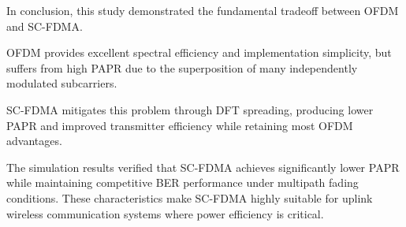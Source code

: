 In conclusion, this study demonstrated the fundamental tradeoff between
OFDM and SC-FDMA.

OFDM provides excellent spectral efficiency and implementation simplicity,
but suffers from high PAPR due to the superposition of many independently
modulated subcarriers.

SC-FDMA mitigates this problem through DFT spreading, producing lower PAPR
and improved transmitter efficiency while retaining most OFDM advantages.

The simulation results verified that SC-FDMA achieves significantly lower
PAPR while maintaining competitive BER performance under multipath fading
conditions. These characteristics make SC-FDMA highly suitable for uplink
wireless communication systems where power efficiency is critical.